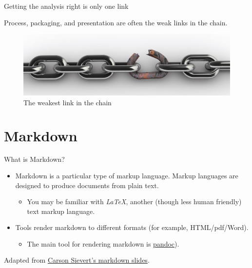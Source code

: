 \documentclass[ignorenonframetext,]{beamer}
\providecommand{\tightlist}{%
  \setlength{\itemsep}{0pt}\setlength{\parskip}{0pt}}
\begin{document}
\begin{frame}{%
\protect\hypertarget{getting-the-analysis-right-is-only-one-link}{%
Getting the analysis right is only one link}}

Process, packaging, and presentation are often the weak links in the
chain.

\begin{figure}
\centering
\includegraphics{../media/brokenChain.jpg}
\caption{The weakest link in the chain}
\end{figure}

\end{frame}

\hypertarget{markdown}{%
\section{Markdown}\label{markdown}}

\begin{frame}{%
\protect\hypertarget{what-is-markdown}{%
What is Markdown?}}

\begin{itemize}
\tightlist
\item
  Markdown is a particular type of markup language. Markup languages are
  designed to produce documents from plain text.

  \begin{itemize}
  \tightlist
  \item
    You may be familiar with \emph{LaTeX}, another (though less human
    friendly) text markup language.
  \end{itemize}
\item
  Tools render markdown to different formats (for example,
  HTML/pdf/Word).

  \begin{itemize}
  \tightlist
  \item
    The main tool for rendering markdown is
    \href{http://johnmacfarlane.net/pandoc/}{pandoc}).
  \end{itemize}
\end{itemize}

Adapted from
\href{http://cpsievert.github.io/slides/markdown/\#/2}{Carson Sievert’s
markdown slides}.

\end{frame}
\end{document}

